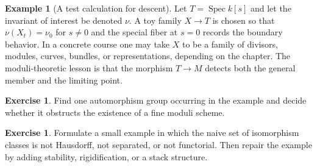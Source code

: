 \documentclass[11pt]{amsart}
\theoremstyle{definition}
\newtheorem{example}[theorem]{Example}
\newtheorem{exercise}[theorem]{Exercise}
\newcommand{\Spec}{\operatorname{Spec}}
\begin{document}
\begin{example}[A test calculation for descent]
Let $T=\Spec k[s]$ and let the invariant of interest be denoted $\nu$.  A toy family $X\to T$ is chosen so that $\nu(X_t)=\nu_0$ for $s\ne0$ and the special fiber at $s=0$ records the boundary behavior.  In a concrete course one may take $X$ to be a family of divisors, modules, curves, bundles, or representations, depending on the chapter.  The moduli-theoretic lesson is that the morphism $T\to M$ detects both the general member and the limiting point.
\end{example}
\begin{exercise}
Find one automorphism group occurring in the example and decide whether it obstructs the existence of a fine moduli scheme.
\end{exercise}
\begin{exercise}
Formulate a small example in which the naive set of isomorphism classes is not Hausdorff, not separated, or not functorial.  Then repair the example by adding stability, rigidification, or a stack structure.
\end{exercise}
\clearpage
\end{document}
